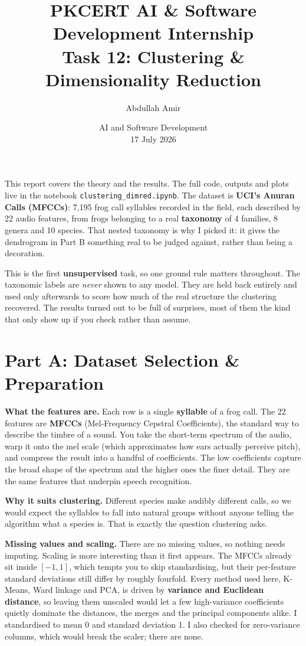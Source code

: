\documentclass[11pt,a4paper]{article}
\title{\vspace{-1.5cm}\textbf{PKCERT AI \& Software Development Internship \\ Task 12: Clustering \& Dimensionality Reduction}}
\author{Abdullah Amir}
\date{AI and Software Development \\ 17 July 2026}
\begin{document}
\maketitle
\vspace{-0.8cm}

This report covers the theory and the results. The full code, outputs and plots live in
the notebook \texttt{clustering\_dimred.ipynb}. The dataset is \textbf{UCI's Anuran Calls
(MFCCs)}: 7,195 frog call syllables recorded in the field, each described by 22 audio
features, from frogs belonging to a real \textbf{taxonomy} of 4 families, 8 genera and 10
species. That nested taxonomy is why I picked it: it gives the dendrogram in Part B
something real to be judged against, rather than being a decoration.

This is the first \textbf{unsupervised} task, so one ground rule matters throughout. The
taxonomic labels are \emph{never} shown to any model. They are held back entirely and
used only afterwards to score how much of the real structure the clustering recovered.
The results turned out to be full of surprises, most of them the kind that only show up
if you check rather than assume.

\section*{Part A: Dataset Selection \& Preparation}

\textbf{What the features are.} Each row is a single \textbf{syllable} of a frog call.
The 22 features are \textbf{MFCCs} (Mel-Frequency Cepstral Coefficients), the standard
way to describe the timbre of a sound. You take the short-term spectrum of the audio,
warp it onto the mel scale (which approximates how ears actually perceive pitch), and
compress the result into a handful of coefficients. The low coefficients capture the
broad shape of the spectrum and the higher ones the finer detail. They are the same
features that underpin speech recognition.

\textbf{Why it suits clustering.} Different species make audibly different calls, so we
would expect the syllables to fall into natural groups without anyone telling the
algorithm what a species is. That is exactly the question clustering asks.

\textbf{Missing values and scaling.} There are no missing values, so nothing needs
imputing. Scaling is more interesting than it first appears. The MFCCs already sit inside
$[-1, 1]$, which tempts you to skip standardising, but their per-feature standard
deviations still differ by roughly fourfold. Every method used here, K-Means, Ward
linkage and PCA, is driven by \textbf{variance and Euclidean distance}, so leaving them
unscaled would let a few high-variance coefficients quietly dominate the distances, the
merges and the principal components alike. I standardised to mean 0 and standard
deviation 1. I also checked for zero-variance columns, which would break the scaler;
there are none.
\end{document}

